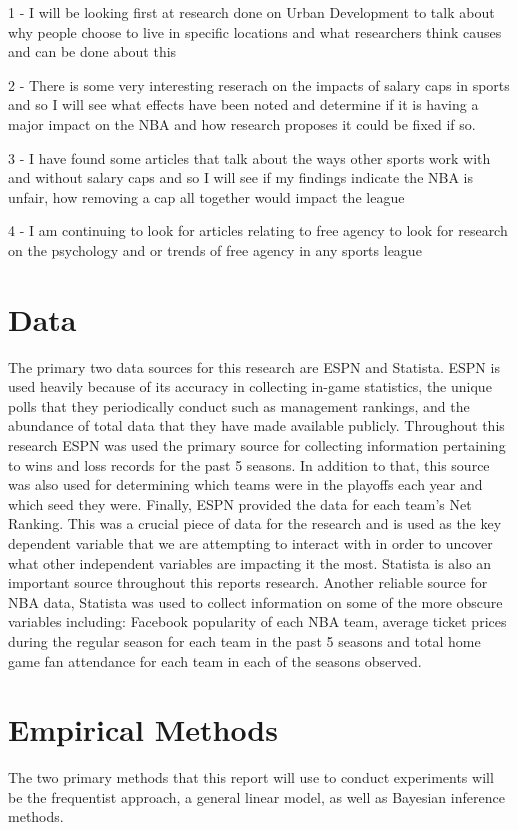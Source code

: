 \documentclass[12pt,english]{article}
\begin{document}
1 - I will be looking first at research done on Urban Development to talk about why people choose to live in specific locations and what researchers think causes and can be done about this

2 - There is some very interesting reserach on the impacts of salary caps in sports and so I will see what effects have been noted and determine if it is having a major impact on the NBA and how research proposes it could be fixed if so. 

3 - I have found some articles that talk about the ways other sports work with and without salary caps and so I will see if my findings indicate the NBA is unfair, how removing a cap all together would impact the league

4 - I am continuing to look for articles relating to free agency to look for research on the psychology and or trends of free agency in any sports league



\section{Data}\label{sec:data}
The primary two data sources for this research are ESPN and Statista. \newline
ESPN is used heavily because of its accuracy in collecting in-game statistics, the unique polls that they periodically conduct such as management rankings, and the abundance of total data that they have made available publicly. Throughout this research ESPN was used the primary source for collecting information pertaining to wins and loss records for the past 5 seasons. In addition to that, this source was also used for determining which teams were in the playoffs each year and which seed they were. Finally, ESPN provided the data for each team's Net Ranking. This was a crucial piece of data for the research and is used as the key dependent variable that we are attempting to interact with in order to uncover what other independent variables are impacting it the most. Statista is also an important source throughout this reports research. Another reliable source for NBA data, Statista was used to collect information on some of the more obscure variables including: Facebook popularity of each NBA team, average ticket prices during the regular season for each team in the past 5 seasons and total home game fan attendance for each team in each of the seasons observed. 
\section{Empirical Methods}\label{sec:methods}
The two primary methods that this report will use to conduct experiments will be the frequentist approach, a general linear model, as well as Bayesian inference methods. 
\end{document}
